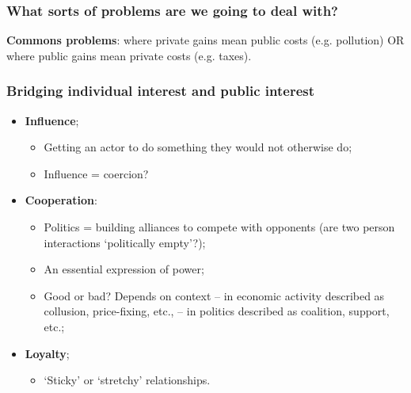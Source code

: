 \documentclass[aspectratio=169]{beamer}
\theoremstyle{principle}
\begin{document}
\begin{frame}
\frametitle{What sorts of problems are we going to deal with?}
\begin{center}
\Large \textbf{Commons problems}: where private gains mean public costs (e.g. pollution) OR where public gains mean private costs (e.g. taxes).
\end{center}
\end{frame}

\begin{frame}
\frametitle{Bridging individual interest and public interest}
\begin{itemize}
\item \textbf{Influence};
\begin{itemize}
\item Getting an actor to do something they would not otherwise do;
\item Influence = coercion?  
\end{itemize}
\bigskip
\bigskip
\item \textbf{Cooperation}:
\begin{itemize}
\item Politics = building alliances to compete with opponents (are two person interactions `politically empty'?);
\item An essential expression of power;
\item Good or bad?  Depends on context -- in economic activity described as collusion, price-fixing, etc., -- in politics described as coalition, support, etc.;
\end{itemize}
\bigskip
\bigskip
\item \textbf{Loyalty};
\begin{itemize}
\item `Sticky' or `stretchy' relationships.
\end{itemize}
\end{itemize}
\end{frame}
\end{document}
